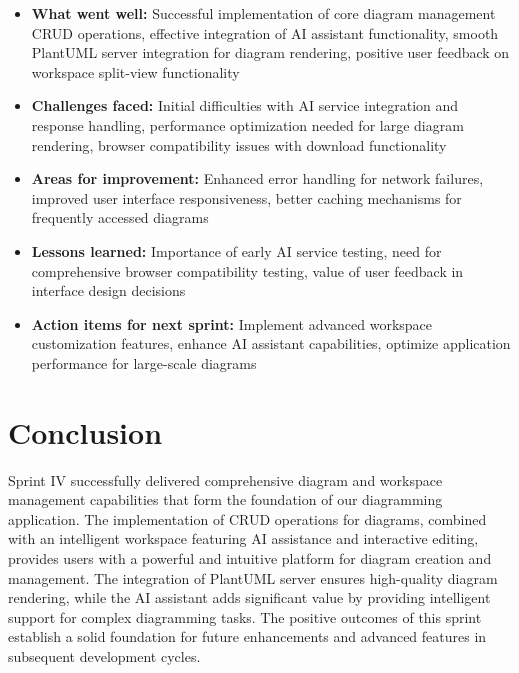 \begin{itemize}
\item \textbf{What went well:} Successful implementation of core diagram management CRUD operations, effective integration of AI assistant functionality, smooth PlantUML server integration for diagram rendering, positive user feedback on workspace split-view functionality
\item \textbf{Challenges faced:} Initial difficulties with AI service integration and response handling, performance optimization needed for large diagram rendering, browser compatibility issues with download functionality
\item \textbf{Areas for improvement:} Enhanced error handling for network failures, improved user interface responsiveness, better caching mechanisms for frequently accessed diagrams
\item \textbf{Lessons learned:} Importance of early AI service testing, need for comprehensive browser compatibility testing, value of user feedback in interface design decisions
\item \textbf{Action items for next sprint:} Implement advanced workspace customization features, enhance AI assistant capabilities, optimize application performance for large-scale diagrams
\end{itemize}

\section{Conclusion}

Sprint IV successfully delivered comprehensive diagram and workspace management capabilities that form the foundation of our diagramming application. The implementation of CRUD operations for diagrams, combined with an intelligent workspace featuring AI assistance and interactive editing, provides users with a powerful and intuitive platform for diagram creation and management. The integration of PlantUML server ensures high-quality diagram rendering, while the AI assistant adds significant value by providing intelligent support for complex diagramming tasks. The positive outcomes of this sprint establish a solid foundation for future enhancements and advanced features in subsequent development cycles.